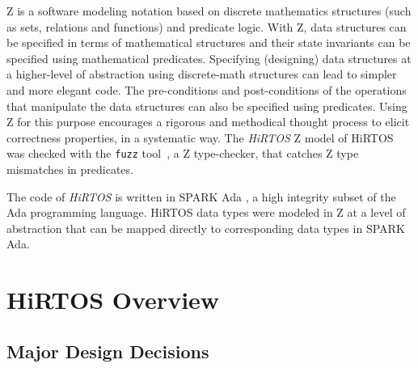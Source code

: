 \documentclass{AUJarticle}
\begin{document}
Z is a software modeling notation based on discrete mathematics structures (such as sets,
relations and functions) and predicate logic. With Z, data structures can be specified in
terms of mathematical structures and their state invariants can be specified using mathematical
predicates. Specifying (designing) data structures at a higher-level of abstraction using
discrete-math structures can lead to simpler and more elegant code. The pre-conditions and
post-conditions of the operations that manipulate the data structures can also be specified
using predicates. Using Z for this purpose encourages a rigorous and methodical thought process
to elicit correctness properties, in a systematic way.
The \emph{HiRTOS} Z model of HiRTOS was checked with the \verb'fuzz' tool~\cite{Fuzz}, a
Z type-checker, that catches Z type mismatches in predicates.

The code of \emph{HiRTOS} is written in SPARK Ada \cite{SparkAda}, a high integrity
subset of the Ada programming language. HiRTOS data types were modeled in Z at a level of
abstraction that can be mapped directly to corresponding data types in SPARK Ada.

\section{HiRTOS Overview}

\subsection{Major Design Decisions}
\end{document}
